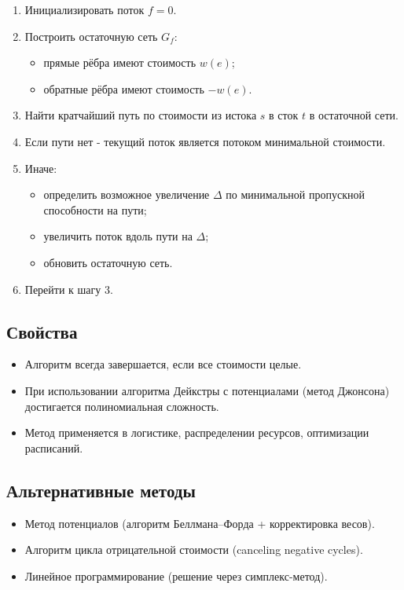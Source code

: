 {\begin{enumerate}
  \item Инициализировать поток $f = 0$.
  \item Построить остаточную сеть $G_f$:
  \begin{itemize}
    \item прямые рёбра имеют стоимость $w(e)$;
    \item обратные рёбра имеют стоимость $-w(e)$.
  \end{itemize}
  \item Найти кратчайший путь по стоимости из истока $s$ в сток $t$ в остаточной сети.
  \item Если пути нет - текущий поток является потоком минимальной стоимости.
  \item Иначе:
  \begin{itemize}
    \item определить возможное увеличение $\Delta$ по минимальной пропускной способности на пути;
    \item увеличить поток вдоль пути на $\Delta$;
    \item обновить остаточную сеть.
  \end{itemize}
  \item Перейти к шагу 3.
\end{enumerate}

\subsection*{Свойства}

\begin{itemize}
  \item Алгоритм всегда завершается, если все стоимости целые.
  \item При использовании алгоритма Дейкстры с потенциалами (метод Джонсона) достигается полиномиальная сложность.
  \item Метод применяется в логистике, распределении ресурсов, оптимизации расписаний.
\end{itemize}

\subsection*{Альтернативные методы}

\begin{itemize}
  \item Метод потенциалов (алгоритм Беллмана–Форда + корректировка весов).
  \item Алгоритм цикла отрицательной стоимости (canceling negative cycles).
  \item Линейное программирование (решение через симплекс-метод).
\end{itemize}


    \newpage
}
